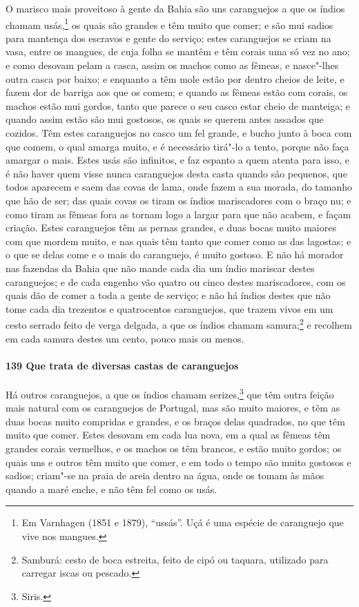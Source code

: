 O marisco mais proveitoso à gente da Bahia são uns caranguejos a que os índios chamam
usás,\footnote{ Em Varnhagen (1851 e 1879), ``ussás''. Uçá é uma espécie de caranguejo que
vive nos mangues.} os quais são grandes e têm muito que comer; e são mui sadios para
mantença dos escravos e gente do serviço; estes caranguejos se criam na vasa, entre os
mangues, de cuja folha se mantêm e têm corais uma só vez no ano; e como desovam pelam a
casca, assim os machos como as fêmeas, e nasce"-lhes outra casca por baixo; e enquanto a
têm mole estão por dentro cheios de leite, e fazem dor de barriga aos que os comem; e
quando as fêmeas estão com corais, os machos estão mui gordos, tanto que parece o seu
casco estar cheio de manteiga; e quando assim estão são mui gostosos, os quais se querem
antes assados que cozidos. Têm estes caranguejos no casco um fel grande, e bucho junto à
boca com que comem, o qual amarga muito, e é necessário tirá"-lo a tento, porque não faça
amargar o mais. Estes usás são infinitos, e faz espanto a quem atenta para isso, e é não
haver quem visse nunca caranguejos desta casta quando são pequenos, que todos aparecem e
saem das covas de lama, onde fazem a sua morada, do tamanho que hão de ser; das quais
covas os tiram os índios mariscadores com o braço nu; e como tiram as fêmeas fora as
tornam logo a largar para que não acabem, e façam criação. Estes caranguejos têm as pernas
grandes, e duas bocas muito maiores com que mordem muito, e nas quais têm tanto que comer
como as das lagostas; e o que se delas come e o mais do caranguejo, é muito gostoso. E não
há morador nas fazendas da Bahia que não mande cada dia um índio mariscar destes
caranguejos; e de cada engenho vão quatro ou cinco destes mariscadores, com os quais dão
de comer a toda a gente de serviço; e não há índios destes que não tome cada dia trezentos
e quatrocentos caranguejos, que trazem vivos em um cesto serrado feito de verga delgada, a
que os índios chamam samura;\footnote{ Samburá: cesto de boca estreita, feito de cipó ou
taquara, utilizado para carregar iscas ou pescado.} e recolhem em cada samura destes um
cento, pouco mais ou menos.

\paragraph{139 Que trata de diversas castas de caranguejos}

Há outros caranguejos, a que os índios chamam serizes,\footnote{ Siris.} que têm outra
feição mais natural com os caranguejos de Portugal, mas são muito maiores, e têm as duas
bocas muito compridas e grandes, e os braços delas quadrados, no que têm muito que comer.
Estes desovam em cada lua nova, em a qual as fêmeas têm grandes corais vermelhos, e os
machos os têm brancos, e estão muito gordos; os quais uns e outros têm muito que comer, e
em todo o tempo são muito gostosos e sadios; criam"-se na praia de areia dentro na água,
onde os tomam às mãos quando a maré enche, e não têm fel como os usás.

